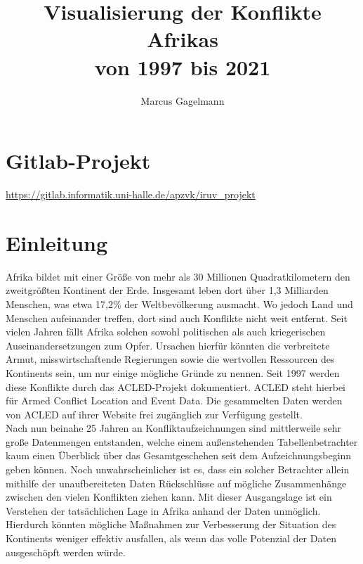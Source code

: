\documentclass[usegeometry=true]{scrartcl}
\begin{document}
\subject{Projektbericht zum Modul Information Retrieval und Visualisierung Sommersemester 2021}
\title{Visualisierung der Konflikte Afrikas\\ von 1997 bis 2021}
\author{Marcus Gagelmann}%
\maketitle%

\section*{Gitlab-Projekt}
\url{https://gitlab.informatik.uni-halle.de/apzvk/iruv_projekt}

\section{Einleitung}
Afrika bildet mit einer Größe von mehr als 30 Millionen Quadratkilometern den zweitgrößten Kontinent der Erde. Insgesamt leben dort über 1,3 Milliarden Menschen, was etwa 17,2\% der Weltbevölkerung ausmacht. Wo jedoch Land und Menschen aufeinander treffen, dort sind auch Konflikte nicht weit entfernt. Seit vielen Jahren fällt Afrika solchen sowohl politischen als auch kriegerischen Auseinandersetzungen zum Opfer. Ursachen hierfür könnten die verbreitete Armut, misswirtschaftende Regierungen sowie die wertvollen Ressourcen des Kontinents sein, um nur einige mögliche Gründe zu nennen. Seit 1997 werden diese Konflikte durch das ACLED-Projekt dokumentiert. ACLED steht hierbei für \glqq Armed Conflict Location and Event Data\grqq{}. Die gesammelten Daten werden von ACLED auf ihrer Website \cite{acled} frei zugänglich zur Verfügung gestellt.\\

Nach nun beinahe 25 Jahren an Konfliktaufzeichnungen sind mittlerweile sehr große Datenmengen entstanden, welche einem außenstehenden Tabellenbetrachter kaum einen Überblick über das Gesamtgeschehen seit dem Aufzeichnungsbeginn geben können. Noch unwahrscheinlicher ist es, dass ein solcher Betrachter allein mithilfe der unaufbereiteten Daten Rückschlüsse auf mögliche Zusammenhänge zwischen den vielen Konflikten ziehen kann. Mit dieser Ausgangslage ist ein Verstehen der tatsächlichen Lage in Afrika anhand der Daten unmöglich. Hierdurch könnten mögliche Maßnahmen zur Verbesserung der Situation des Kontinents weniger effektiv ausfallen, als wenn das volle Potenzial der Daten ausgeschöpft werden würde.\\
\end{document}
